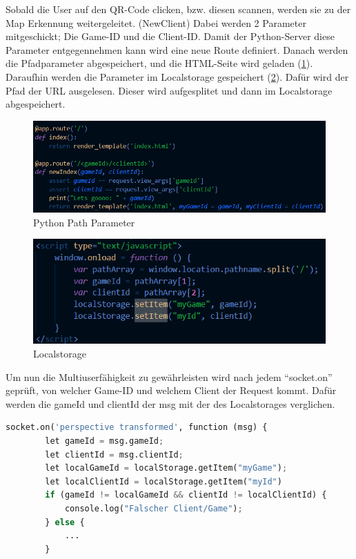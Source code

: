 Sobald die User auf den QR-Code clicken, bzw. diesen scannen, werden sie zu der Map Erkennung weitergeleitet. (NewClient)
Dabei werden 2 Parameter mitgeschickt; Die Game-ID und die Client-ID. Damit der Python-Server diese Parameter entgegennehmen kann wird eine neue Route definiert. Danach werden die Pfadparameter abgespeichert,
und die HTML-Seite wird geladen (\ref*{PythonParam}). Daraufhin werden die Parameter im Localstorage gespeichert (\ref*{localstorage_map}). Dafür wird der Pfad der URL ausgelesen. Dieser wird aufgesplitet und dann im Localstorage abgespeichert.
\begin{figure}[H]
  \centering
  \includegraphics[scale=0.85]{pics/python_Params.png}
  \caption{Python Path Parameter}
  \label{PythonParam}
\end{figure}



\begin{figure}[H]
  \centering
  \includegraphics[scale=0.85]{pics/localStorage.png}
  \caption{Localstorage}
  \label{localstorage_map}
\end{figure}

Um nun die Multiuserfähigkeit zu gewährleisten wird nach jedem ``socket.on'' geprüft,
von welcher Game-ID und welchem Client der Request kommt. Dafür werden die gameId und clientId der msg mit der des Localstorages verglichen.

\begin{lstlisting}[language=Python,caption= Socket.on Beispielüberprüfung]
    socket.on('perspective transformed', function (msg) {
        let gameId = msg.gameId;
        let clientId = msg.clientId;
        let localGameId = localStorage.getItem("myGame");
        let localClientId = localStorage.getItem("myId")
        if (gameId != localGameId && clientId != localClientId) {
            console.log("Falscher Client/Game");
        } else {
            ...
        }
\end{lstlisting}

